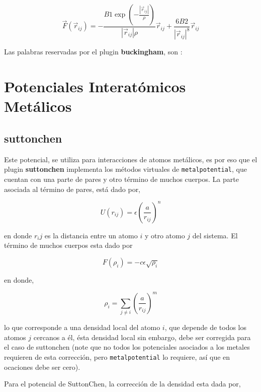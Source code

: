 $$\vec{F}(\vec{r}_{ij}) = -\frac{B1\exp\left(-\frac{|\vec{r}_{ij}|}{\rho}\right)}{|\vec{r}_{ij}|\rho}\vec{r}_{ij} + \frac{6B2}{|\vec{r}_{ij}|^8}\vec{r}_{ij}$$

Las palabras reservadas por el plugin \textbf{buckingham}, son :


\section{Potenciales Interat\'omicos Met\'alicos}
\subsection{suttonchen}
Este potencial, se utiliza para interacciones de atomos met\'alicos, es por eso que el plugin \textbf{suttonchen} implementa los m\'etodos virtuales de \verb|metalpotential|, que cuentan con una parte de pares y otro t\'ermino de muchos cuerpos. La parte asociada al t\'ermino de pares, est\'a dado por,

$$U(r_{ij}) = \epsilon\left(\frac{a}{r_{ij}}\right)^n$$

en donde $r_ij$ es la distancia entre un atomo $i$ y otro atomo $j$ del sistema. El t\'ermino de muchos cuerpos esta dado por

$$F(\rho_{i}) = -c\epsilon\sqrt{\rho_i}$$

en donde,

$$\rho_i = \sum_{j\neq i} \left(\frac{a}{r_{ij}}\right)^m$$

lo que corresponde a una densidad local del atomo $i$, que depende de todos los atomos $j$ cercanos a \'el, \'esta densidad local sin embargo, debe ser corregida para el caso de suttonchen (note que no todos los potenciales asociados a los metales requieren de esta correcci\'on, pero \verb|metalpotential| lo requiere, as\'i que en ocaciones debe ser cero).

Para el potencial de SuttonChen, la correcci\'on de la densidad esta dada por,


